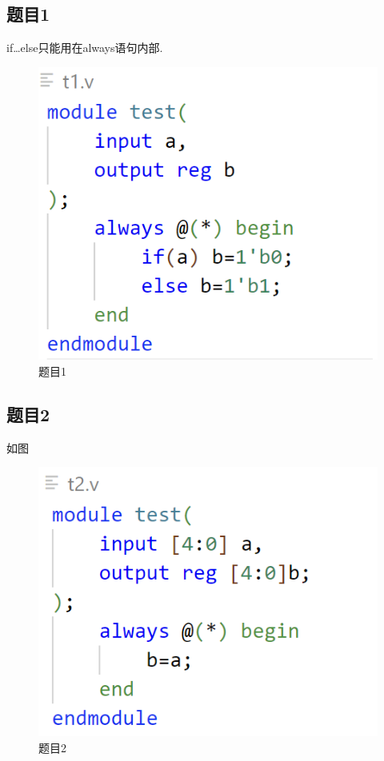 \documentclass{article}
\begin{document}
    \subsection*{题目1} if\ldots else只能用在always语句内部.
	\begin{figure}[htbp]
		\centering
		\includegraphics[scale=1]{t1.png}
		\caption*{题目1}
	\end{figure}
	\clearpage
    \subsection*{题目2} 如图
	\begin{figure}[htbp]
		\centering
		\includegraphics[scale=1]{t2.png}
		\caption*{题目2}
	\end{figure}
\end{document}
